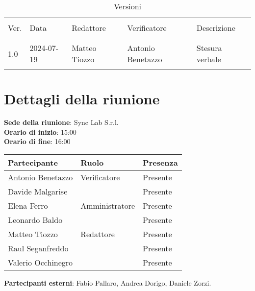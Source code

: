 \documentclass[italian,12pt]{article}
\begin{document}


\newpage



\begin{table}[!h]
	\caption{Versioni}
	\footnotesize
	\begin{center}
		\begin{tabular}{ l l l l p{6cm} }
			\hline                                                                     \\[-2ex]
			Ver. & Data       & Redattore        & Verificatore      & Descrizione     \\
			\\[-2ex] \hline \\[-1.5ex]
			1.0  & 2024-07-19 & Matteo Tiozzo    & Antonio Benetazzo & Stesura verbale \\
			\\[-1.5ex] \hline
		\end{tabular}
	\end{center}
\end{table}

\newpage

\tableofcontents

\newpage

\section{Dettagli della riunione}

\textbf{Sede della riunione}: Sync Lab S.r.l.\\
\textbf{Orario di inizio}: 15:00\\
\textbf{Orario di fine}: 16:00\\

\begin{flushleft}
	\begin{table}[!h]
		\begin{tabular}{ |l|l|l| }
			\hline
			\textbf{Partecipante} & \textbf{Ruolo} & \textbf{Presenza} \\
			\hline
			Antonio Benetazzo     & Verificatore   & Presente          \\
			Davide Malgarise      &                & Presente          \\
			Elena Ferro           & Amministratore & Presente          \\
			Leonardo Baldo        &       		   & Presente          \\
			Matteo Tiozzo         & Redattore      & Presente          \\
			Raul Seganfreddo      &                & Presente          \\
			Valerio Occhinegro    &                & Presente          \\
			\hline
		\end{tabular}
	\end{table}
	\textbf{Partecipanti esterni}: Fabio Pallaro, Andrea Dorigo, Daniele Zorzi.\\
\end{flushleft}
\end{document}
